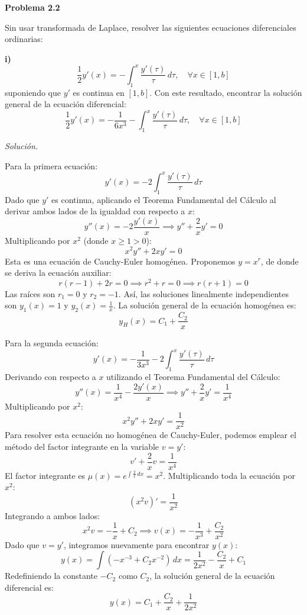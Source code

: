 \documentclass[12pt,letterpaper]{article}
\begin{document}
\bigskip

\textbf{Problema 2.2}

\medskip
Sin usar transformada de Laplace, resolver las siguientes ecuaciones diferenciales ordinarias:

\medskip
\textbf{i)}
\begin{equation}
  \frac{1}{2} y'(x) = -\int_1^x \frac{y'(\tau)}{\tau} \, d\tau, \quad \forall x \in [1, b]
\end{equation}
suponiendo que $y'$ es continua en $[1, b]$. Con este resultado, encontrar la solución general de la ecuación diferencial:
\begin{equation}
  \frac{1}{2} y'(x) = -\frac{1}{6x^3} - \int_1^x \frac{y'(\tau)}{\tau} \, d\tau, \quad \forall x \in [1, b]
\end{equation}

\medskip
\textit{Solución.}

Para la primera ecuación:
\[
  y'(x) = -2\int_1^x \frac{y'(\tau)}{\tau} \, d\tau
\]
Dado que $y'$ es continua, aplicando el Teorema Fundamental del Cálculo al derivar ambos lados de la igualdad con respecto a $x$:
\[
  y''(x) = -2 \frac{y'(x)}{x} \implies y'' + \frac{2}{x} y' = 0
\]
Multiplicando por $x^2$ (donde $x \ge 1 > 0$):
\[
  x^2 y'' + 2x y' = 0
\]
Esta es una ecuación de Cauchy-Euler homogénea. Proponemos $y = x^r$, de donde se deriva la ecuación auxiliar:
\[
  r(r - 1) + 2r = 0 \implies r^2 + r = 0 \implies r(r + 1) = 0
\]
Las raíces son $r_1 = 0$ y $r_2 = -1$. Así, las soluciones linealmente independientes son $y_1(x) = 1$ y $y_2(x) = \frac{1}{x}$. La solución general de la ecuación homogénea es:
\[
  y_H(x) = C_1 + \frac{C_2}{x}
\]

Para la segunda ecuación:
\[
  y'(x) = -\frac{1}{3x^3} - 2\int_1^x \frac{y'(\tau)}{\tau} \, d\tau
\]
Derivando con respecto a $x$ utilizando el Teorema Fundamental del Cálculo:
\[
  y''(x) = \frac{1}{x^4} - \frac{2 y'(x)}{x} \implies y'' + \frac{2}{x} y' = \frac{1}{x^4}
\]
Multiplicando por $x^2$:
\[
  x^2 y'' + 2x y' = \frac{1}{x^2}
\]
Para resolver esta ecuación no homogénea de Cauchy-Euler, podemos emplear el método del factor integrante en la variable $v = y'$:
\[
  v' + \frac{2}{x} v = \frac{1}{x^4}
\]
El factor integrante es $\mu(x) = e^{\int \frac{2}{x} \, dx} = x^2$. Multiplicando toda la ecuación por $x^2$:
\[
  (x^2 v)' = \frac{1}{x^2}
\]
Integrando a ambos lados:
\[
  x^2 v = -\frac{1}{x} + C_2 \implies v(x) = -\frac{1}{x^3} + \frac{C_2}{x^2}
\]
Dado que $v = y'$, integramos nuevamente para encontrar $y(x)$:
\[
  y(x) = \int \left( -x^{-3} + C_2 x^{-2} \right) \, dx = \frac{1}{2x^2} - \frac{C_2}{x} + C_1
\]
Redefiniendo la constante $-C_2$ como $C_2$, la solución general de la ecuación diferencial es:
\[
  y(x) = C_1 + \frac{C_2}{x} + \frac{1}{2x^2}
\]
\end{document}
